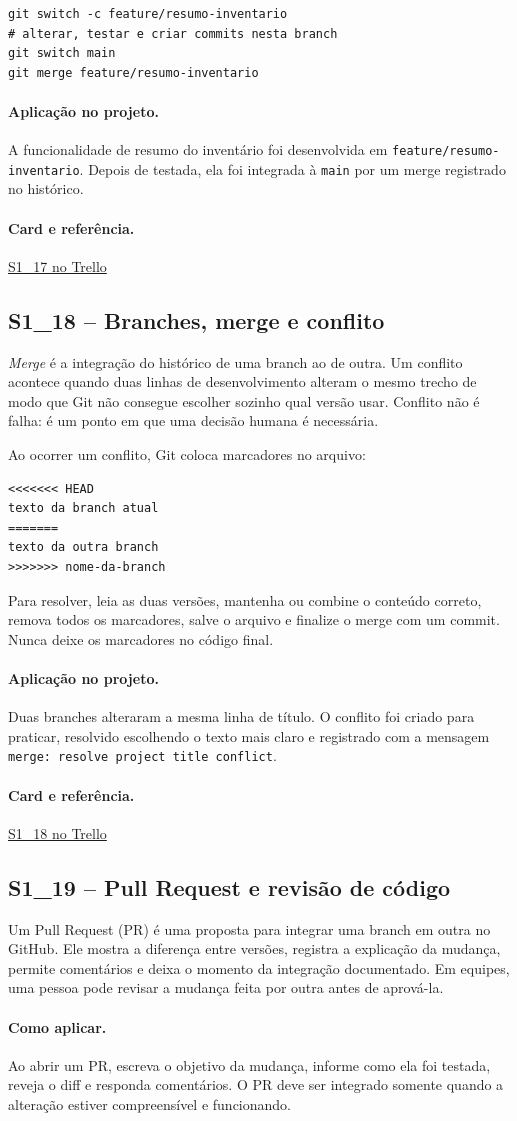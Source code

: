 \documentclass[11pt,a4paper]{article}
\newcommand{\projeto}{\paragraph{Aplicação no projeto.}}
\newcommand{\comoaplicar}{\paragraph{Como aplicar.}}
\newcommand{\referencia}[2]{\paragraph{Card e referência.}\href{#1}{#2}}
\newcommand{\cardsection}[1]{\Needspace{12\baselineskip}\subsection{#1}}
\begin{document}
\begin{lstlisting}[caption={Criar e integrar uma branch}]
git switch -c feature/resumo-inventario
# alterar, testar e criar commits nesta branch
git switch main
git merge feature/resumo-inventario
\end{lstlisting}

\projeto
A funcionalidade de resumo do inventário foi desenvolvida em \texttt{feature/resumo-inventario}. Depois de testada, ela foi integrada à \texttt{main} por um merge registrado no histórico.

\referencia{https://trello.com/c/Ec5uKKhf}{S1\_17 no Trello}

\cardsection{S1\_18 -- Branches, merge e conflito}

\emph{Merge} é a integração do histórico de uma branch ao de outra. Um conflito acontece quando duas linhas de desenvolvimento alteram o mesmo trecho de modo que Git não consegue escolher sozinho qual versão usar. Conflito não é falha: é um ponto em que uma decisão humana é necessária.

Ao ocorrer um conflito, Git coloca marcadores no arquivo:

\begin{lstlisting}
<<<<<<< HEAD
texto da branch atual
=======
texto da outra branch
>>>>>>> nome-da-branch
\end{lstlisting}

Para resolver, leia as duas versões, mantenha ou combine o conteúdo correto, remova todos os marcadores, salve o arquivo e finalize o merge com um commit. Nunca deixe os marcadores no código final.

\projeto
Duas branches alteraram a mesma linha de título. O conflito foi criado para praticar, resolvido escolhendo o texto mais claro e registrado com a mensagem \texttt{merge: resolve project title conflict}.

\referencia{https://trello.com/c/kFfXpK39}{S1\_18 no Trello}

\cardsection{S1\_19 -- Pull Request e revisão de código}

Um Pull Request (PR) é uma proposta para integrar uma branch em outra no GitHub. Ele mostra a diferença entre versões, registra a explicação da mudança, permite comentários e deixa o momento da integração documentado. Em equipes, uma pessoa pode revisar a mudança feita por outra antes de aprová-la.

\comoaplicar
Ao abrir um PR, escreva o objetivo da mudança, informe como ela foi testada, reveja o diff e responda comentários. O PR deve ser integrado somente quando a alteração estiver compreensível e funcionando.
\end{document}
